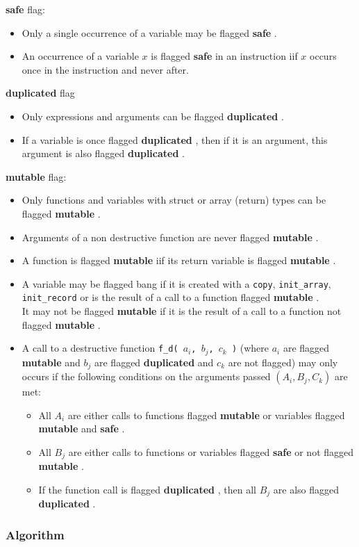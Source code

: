 \documentclass[12pt,a4paper]{article}
\newcommand{\cl}[1]{\texttt{#1}}
\newcommand{\bang}{\textbf{mutable }}
\newcommand{\safe}{\textbf{safe }}
\newcommand{\dupl}{\textbf{duplicated }}
\begin{document}
\safe flag:
\begin{itemize}
  \item Only a single occurrence of a variable may be flagged \safe.
  \item An occurrence of a variable $x$ is flagged \safe in an instruction iif $x$ occurs once in the instruction and never after.
\end{itemize}

\dupl flag
\begin{itemize}
  \item Only expressions and arguments can be flagged \dupl.
  \item If a variable is once flagged \dupl, then if it is an argument, this argument is also flagged \dupl.
\end{itemize}

\bang flag:
\begin{itemize}
  \item Only functions and variables with struct or array (return) types can be flagged \bang.
  \item Arguments of a non destructive function are never flagged \bang.
  \item A function is flagged \bang iif its return variable is flagged \bang.
  \item A variable may be flagged bang if it is created with a \cl{copy}, \cl{init\_array}, \cl{init\_record} or is the result of a call to a function flagged \bang.\\
It may not be flagged \bang if it is the result of a call to a function not flagged \bang.
  \item A call to a destructive function \cl{f\_d( $a_i$, $b_j$, $c_k$ )} (where $a_i$ are flagged \bang and $b_j$ are flagged \dupl and $c_k$ are not flagged) may only occurs if the following conditions on the arguments passed $( A_i, B_j, C_k )$ are met:
\begin{itemize}
   \item All $A_i$ are either calls to functions flagged \bang or variables flagged \bang and \safe.
   \item All $B_j$ are either calls to functions or variables flagged \safe or not flagged \bang.
   \item If the function call is flagged \dupl, then all $B_j$ are also flagged \dupl.
\end{itemize}
\end{itemize}


\subsubsection*{Algorithm}
\end{document}
